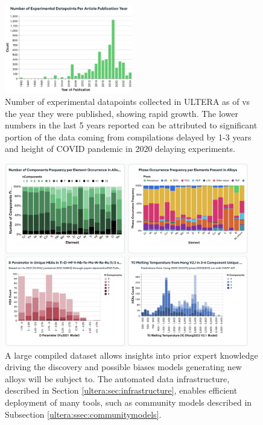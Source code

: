 \begin{figure}[H]
    \centering
    \includegraphics[width=0.5\textwidth]{ultera/ultera_PublicationYear.png}
    \caption{Number of experimental datapoints collected in ULTERA as of \statisticstime vs the year they were published, showing rapid growth. The lower numbers in the last 5 years reported can be attributed to significant portion of the data coming from compilations delayed by 1-3 years and height of COVID pandemic in 2020 delaying experiments.}
    \label{ultera:fig:publicationyears}
\end{figure}


\begin{figure}[H]
    \centering
    \includegraphics[width=0.95\textwidth]{ultera/ULTERA_Insights.png}
    \caption{A large compiled dataset allows insights into prior expert knowledge driving the discovery and possible biases models generating new alloys will be subject to. The automated data infrastructure, described in Section \ref{ultera:sec:infrastructure}, enables efficient deployment of many tools, such as community models described in Subsection \ref{ultera:ssec:communitymodels}.}
    \label{ultera:fig:insights}
\end{figure}



